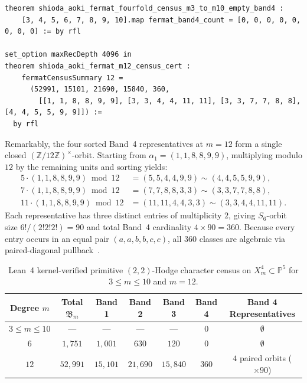 \documentclass[11pt,a4paper]{article}
\begin{document}
\begin{lstlisting}[caption={Low-degree Band~4 vanishing and $m = 12$ Galois orbit census.}]
theorem shioda_aoki_fermat_fourfold_census_m3_to_m10_empty_band4 :
    [3, 4, 5, 6, 7, 8, 9, 10].map fermat_band4_count = [0, 0, 0, 0, 0, 0, 0, 0] := by rfl

set_option maxRecDepth 4096 in
theorem shioda_aoki_fermat_m12_census_cert :
    fermatCensusSummary 12 =
      (52991, 15101, 21690, 15840, 360,
        [[1, 1, 8, 8, 9, 9], [3, 3, 4, 4, 11, 11], [3, 3, 7, 7, 8, 8], [4, 4, 5, 5, 9, 9]]) :=
  by rfl
\end{lstlisting}

Remarkably, the four sorted Band~4 representatives at $m = 12$ form a single closed $(\mathbb{Z}/12\mathbb{Z})^\times$-orbit. Starting from $\alpha_1 = (1, 1, 8, 8, 9, 9)$, multiplying modulo $12$ by the remaining units and sorting yields:
\begin{align}
  5 \cdot (1, 1, 8, 8, 9, 9) \bmod 12 &= (5, 5, 4, 4, 9, 9) \sim (4, 4, 5, 5, 9, 9), \\
  7 \cdot (1, 1, 8, 8, 9, 9) \bmod 12 &= (7, 7, 8, 8, 3, 3) \sim (3, 3, 7, 7, 8, 8), \\
  11 \cdot (1, 1, 8, 8, 9, 9) \bmod 12 &= (11, 11, 4, 4, 3, 3) \sim (3, 3, 4, 4, 11, 11).
\end{align}
Each representative has three distinct entries of multiplicity $2$, giving $S_6$-orbit size $6! / (2!2!2!) = 90$ and total Band~4 cardinality $4 \times 90 = 360$. Because every entry occurs in an equal pair $(a, a, b, b, c, c)$, all $360$ classes are algebraic via paired-diagonal pullback~\cite{Aoki1983}.

\begin{table}[htbp]
  \centering
  \caption{Lean~4 kernel-verified primitive $(2,2)$-Hodge character census on $X_m^4 \subset \mathbb{P}^5$ for $3 \le m \le 10$ and $m = 12$.}
  \label{tab:shioda_census}
  \begin{tabular}{ccccccc}
    \toprule
    Degree $m$ & Total $\mathfrak{B}_m$ & Band 1 & Band 2 & Band 3 & Band 4 & Band 4 Representatives \\
    \midrule
    $3 \le m \le 10$ & --- & --- & --- & --- & $0$ & $\emptyset$ \\
    $6$ & $1{,}751$ & $1{,}001$ & $630$ & $120$ & $0$ & $\emptyset$ \\
    $12$ & $52{,}991$ & $15{,}101$ & $21{,}690$ & $15{,}840$ & $360$ & $4$ paired orbits ($\times 90$) \\
    \bottomrule
  \end{tabular}
\end{table}
\end{document}

